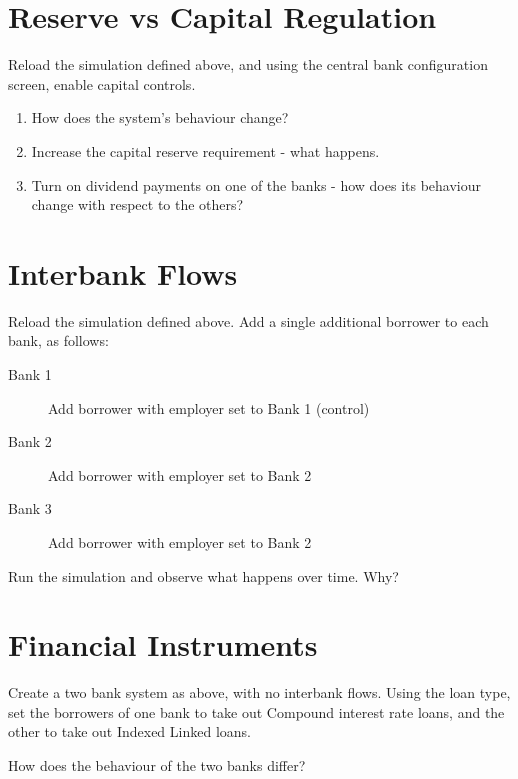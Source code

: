 \documentclass{article}
\begin{document}
\section{Reserve vs Capital Regulation}
Reload the simulation defined above, and using the central bank 
configuration screen, enable capital controls. 

\begin{enumerate}
\item How does the system's behaviour change?
\item Increase the capital reserve requirement - what happens.
\item Turn on dividend payments on one of the banks - how does
its behaviour change with respect to the others?
\end{enumerate}

\section{Interbank Flows}
Reload the simulation defined above. Add a single additional
borrower to each bank, as follows: 

\begin{description}
\item[Bank 1] Add borrower with employer set to Bank 1 (control)
\item[Bank 2] Add borrower with employer set to Bank 2
\item[Bank 3] Add borrower with employer set to Bank 2
\end{description}

Run the simulation and observe what happens over time. Why?

\section{Financial Instruments}
Create a two bank system as above, with no interbank flows. 
Using the loan type, set
the borrowers of one bank to take out Compound interest rate
loans, and the other to take out Indexed Linked loans. 

How does the behaviour of the two banks differ?
\end{document}
